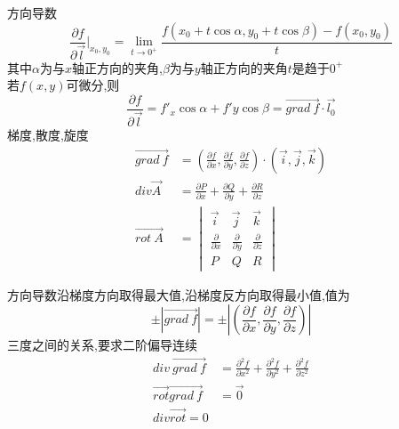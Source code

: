 \documentclass[12pt, a4paper, oneside, UTF8]{ctexbook}
\begin{document}
\begin{tcolorbox}[title=方向导数与三度]
方向导数 
$$
\frac{\partial f}{\partial \vec{l}}\big|_{x_0,y_0} = \lim_{t\to 0^{+}}\frac{f(x_0+t\cos{\alpha},y_0+t\cos{\beta})-f(x_0,y_0)}{t}
$$
其中$\alpha$为与$x$轴正方向的夹角,$\beta$为与$y$轴正方向的夹角$t$是趋于$0^{+}$ \\
若$f(x,y)$可微分,则
$$
\frac{\partial f}{\partial \vec{l}} = f'_x\cos\alpha + f'y\cos\beta = \vec{grad\ f} \cdot \vec{l_0}
$$
梯度,散度,旋度
\begin{align*}
    \vec{grad\ f} &= (\frac{\partial f}{\partial x},\frac{\partial f}{\partial y},\frac{\partial f}{\partial z})\cdot(\vec{i},\vec{j},\vec{k}) \\
    div\vec{A} &= \frac{\partial P}{\partial x} + \frac{\partial Q}{\partial y} + \frac{\partial R}{\partial z} \\
    \vec{rot\ A} &= \begin{vmatrix}
        \vec{i} & \vec{j} & \vec{k} \\
        \frac{\partial}{\partial x} & \frac{\partial}{\partial y} & \frac{\partial}{\partial z} \\
        P & Q & R
    \end{vmatrix}
\end{align*}

{\color{red}方向导数沿梯度方向取得最大值,沿梯度反方向取得最小值},值为
$$
\pm\left|\vec{grad\ f}\right| = \pm\left|(\frac{\partial f}{\partial x},\frac{\partial f}{\partial y},\frac{\partial f}{\partial z})\right|
$$
{\color{red} 三度之间的关系,要求二阶偏导连续}
\begin{align*}
    div\ \vec{grad\ f} &= \frac{\partial^2 f}{\partial x^2} + \frac{\partial^2 f}{\partial y^2} + \frac{\partial^2 f}{\partial z^2} \\
    \vec{rot}\vec{grad\ f} & = \vec{0} \\
    div\vec{rot} = 0
\end{align*}
\end{tcolorbox}
\end{document}
